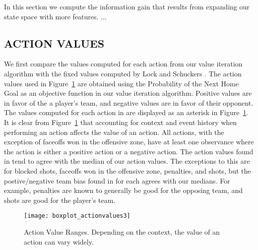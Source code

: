 \documentclass[]{article}
\begin{document}
In this section we compute the information gain that results from expanding our state space with more features. ...

\subsection{ACTION VALUES}

We first compare the values computed for each action from our value iteration algorithm with the fixed values computed by Lock and Schuckers \citep{Lock2009,Schuckers2011}. The action values used in Figure~\ref{fig:boxplot-action-values} are obtained using the Probability of the Next Home Goal as an objective function in our value iteration algorithm. Positive values are in favor of the a player's team, and negative values are in favor of their opponent. The values computed for each action in \citep{Lock2009} are displayed as an asterisk in Figure~\ref{fig:boxplot-action-values}. It is clear from Figure~\ref{fig:boxplot-action-values} that accounting for context and event history when performing an action affects the value of an action. All actions, with the exception of faceoffs won in the offensive zone, have at least one observance where the action is either a positive action or a negative action. The action values found in \citep{Lock2009} tend to agree with the median of our action values. The exceptions to this are for blocked shots, faceoffs won in the offensive zone, penalties, and shots, but the postive/negative team bias found in \citep{Lock2009} for each agrees with our medians. For example, penalties are known to generally be good for the opposing team, and shots are good for the player's team.

%
\begin{figure}[ht]
\texttt{[image: boxplot\_actionvalues3]}
\caption{Action Value Ranges. Depending on the context, the value of an action can vary widely.}
\label{fig:boxplot-action-values}
\end{figure}
\end{document}
